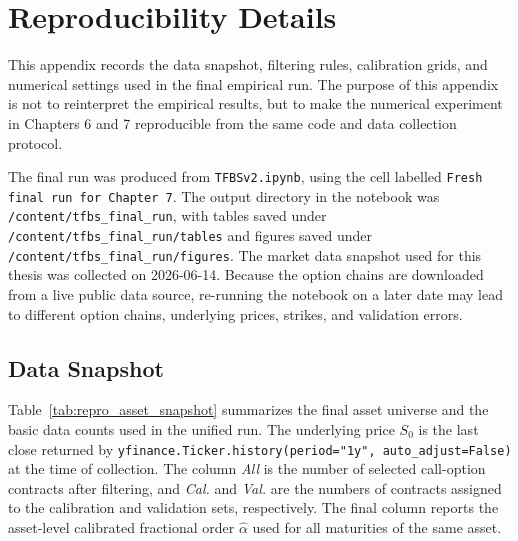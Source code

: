 \documentclass[11pt,a4paper]{report}
\begin{document}
\chapter{Reproducibility Details}
\label{app:reproducibility}

This appendix records the data snapshot, filtering rules, calibration grids, and numerical settings used in the final empirical run. The purpose of this appendix is not to reinterpret the empirical results, but to make the numerical experiment in Chapters 6 and 7 reproducible from the same code and data collection protocol.

The final run was produced from \texttt{TFBSv2.ipynb}, using the cell labelled \texttt{Fresh final run for Chapter 7}. The output directory in the notebook was \texttt{/content/tfbs\_final\_run}, with tables saved under \texttt{/content/tfbs\_final\_run/tables} and figures saved under \texttt{/content/tfbs\_final\_run/figures}. The market data snapshot used for this thesis was collected on 2026-06-14. Because the option chains are downloaded from a live public data source, re-running the notebook on a later date may lead to different option chains, underlying prices, strikes, and validation errors.

\section{Data Snapshot}

Table~\ref{tab:repro_asset_snapshot} summarizes the final asset universe and the basic data counts used in the unified run. The underlying price $S_0$ is the last close returned by \texttt{yfinance.Ticker.history(period="1y", auto\_adjust=False)} at the time of collection. The column \textit{All} is the number of selected call-option contracts after filtering, and \textit{Cal.} and \textit{Val.} are the numbers of contracts assigned to the calibration and validation sets, respectively. The final column reports the asset-level calibrated fractional order $\widehat{\alpha}$ used for all maturities of the same asset.
\end{document}
